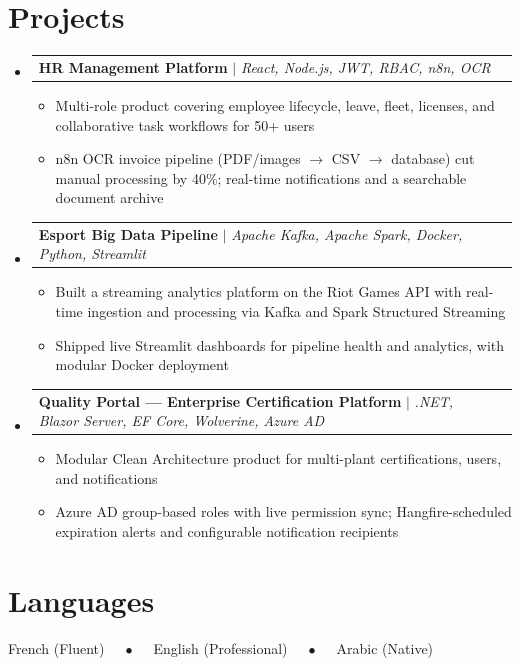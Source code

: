 \documentclass[letterpaper,11pt]{article}
\makeatletter
\newcommand{\resumeItem}[1]{
  \item\small{#1}
}
\newcommand{\resumeProjectHeading}[2]{
    \item
    \begin{tabular*}{0.97\textwidth}{l@{\extracolsep{\fill}}r}
      \small#1 & #2 \\
    \end{tabular*}\vspace{-2pt}
}
\newcommand{\resumeSubHeadingListStart}{\begin{itemize}[leftmargin=0.15in, label={}]}
\newcommand{\resumeSubHeadingListEnd}{\end{itemize}}
\newcommand{\resumeItemListStart}{\begin{itemize}[leftmargin=0.18in,itemsep=1pt]}
\newcommand{\resumeItemListEnd}{\end{itemize}\vspace{1pt}}
\makeatother
\begin{document}
\section{Projects}
    \resumeSubHeadingListStart
      \resumeProjectHeading
          {\textbf{HR Management Platform} $|$ \emph{React, Node.js, JWT, RBAC, n8n, OCR}}{}
          \resumeItemListStart
            \resumeItem{Multi-role product covering employee lifecycle, leave, fleet, licenses, and collaborative task workflows for 50+ users}
            \resumeItem{n8n OCR invoice pipeline (PDF/images $\rightarrow$ CSV $\rightarrow$ database) cut manual processing by 40\%; real-time notifications and a searchable document archive}
          \resumeItemListEnd

      \resumeProjectHeading
          {\textbf{Esport Big Data Pipeline} $|$ \emph{Apache Kafka, Apache Spark, Docker, Python, Streamlit}}{}
          \resumeItemListStart
            \resumeItem{Built a streaming analytics platform on the Riot Games API with real-time ingestion and processing via Kafka and Spark Structured Streaming}
            \resumeItem{Shipped live Streamlit dashboards for pipeline health and analytics, with modular Docker deployment}
          \resumeItemListEnd

      \resumeProjectHeading
          {\textbf{Quality Portal --- Enterprise Certification Platform} $|$ \emph{.NET, Blazor Server, EF Core, Wolverine, Azure AD}}{}
          \resumeItemListStart
            \resumeItem{Modular Clean Architecture product for multi-plant certifications, users, and notifications}
            \resumeItem{Azure AD group-based roles with live permission sync; Hangfire-scheduled expiration alerts and configurable notification recipients}
          \resumeItemListEnd

    \resumeSubHeadingListEnd


\section{Languages}
 \begin{itemize}[leftmargin=0.15in, label={}]
    \small{\item{
     French (Fluent) $\quad\bullet\quad$ English (Professional) $\quad\bullet\quad$ Arabic (Native)
    }}
 \end{itemize}
\end{document}

